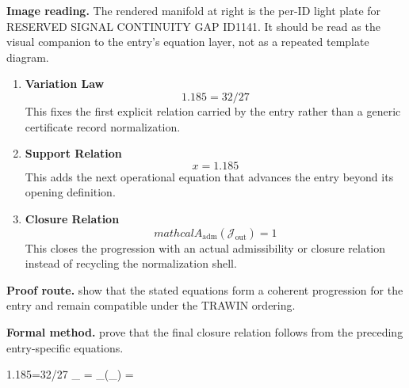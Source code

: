 \begin{samepage}
\noindent\begin{minipage}[t]{0.45\linewidth}
\vspace{0pt}
\raggedright
\scriptsize\textbf{Image reading.} The rendered manifold at right is the per-ID light plate for RESERVED SIGNAL CONTINUITY GAP ID1141. It should be read as the visual companion to the entry's equation layer, not as a repeated template diagram.\par
\end{minipage}\hfill
\begin{minipage}[t]{0.53\linewidth}
\vspace*{-0.10in}
\raggedright
{}
\end{minipage}
\end{samepage}

\clearpage


\begin{enumerate}[leftmargin=1.6em,itemsep=9pt,topsep=6pt]
\item \textbf{Variation Law}
\[
1.185=32/27
\]
This fixes the first explicit relation carried by the entry rather than a generic certificate record normalization.

\item \textbf{Support Relation}
\[
x=1.185
\]
This adds the next operational equation that advances the entry beyond its opening definition.

\item \textbf{Closure Relation}
\[
mathcal{A}_{\mathrm{adm}}\!\left(\mathcal{J}_{\mathrm{out}}\right)=1
\]
This closes the progression with an actual admissibility or closure relation instead of recycling the normalization shell.
\end{enumerate}

\textbf{Proof route.} show that the stated equations form a coherent progression for the entry and remain compatible under the TRAWIN ordering.

\textbf{Formal method.} prove that the final closure relation follows from the preceding entry-specific equations.

\medskip
{}

\begin{tzpsnapshot}
\end{tzpsnapshot}

\tzpequationlinks
  {1.185=32/27}
  {_{} = \cdots}
  {_{}\!\left(_{}\right) = \cdots}
